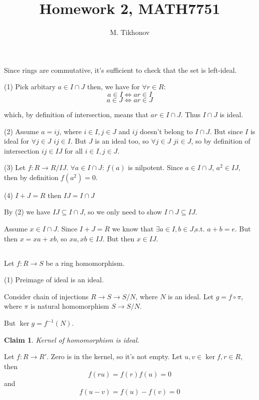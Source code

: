 \documentclass{amsart}
\author{M. Tikhonov}
\title{Homework 2, MATH7751}
\newtheorem*{claim}{Claim}
\begin{document}
\maketitle
\subsection{}

Since rings are commutative, it's sufficient to check that the set is left-ideal.

(1) Pick arbitary $a \in I \cap J$ then, we have for $\forall r \in R$:
$$a \in I \iff ar \in I$$
$$a \in J \iff ar \in J$$

which, by definition of intersection, means that $ar \in I \cap J$. Thus $I \cap J$ is ideal.

(2) Assume $a = ij$, where $i \in I, j \in J$ and $ij$ doesn't belong to $I\cap J$. But since $I$ is ideal for $\forall j \in J$ $ij \in I$. But $J$ is an ideal too, so $\forall j \in J$ $ji \in J$, so by definition of intersection $ij \in IJ$ for all $i \in I, j \in J$.

(3) Let $f: R \to R/ IJ$. $\forall a \in I \cap J$:  $f(a)$ is nilpotent.
Since $a \in I \cap J$, $a^2 \in IJ$, then by definition $f(a^2) = 0$.

(4) $I + J = R$ then $IJ = I \cap J$

By (2) we have $IJ \subseteq I \cap J$, so we only need to show $I \cap J \subseteq IJ$.

Assume $x \in I \cap J$. Since $I+J=R$ we know that $\exists a \in I, b \in J$,s.t. $a+b = e$. But then $x = xa + xb$, so $xa, xb \in IJ$. But then $x \in IJ$.

\subsection{}

Let $f: R \to S$ be a ring homomorphism.

(1) Preimage of ideal is an ideal. 

Consider chain of injections $R \to S \to S/N$, where $N$ is an ideal. Let $g = f \circ \pi$, where $\pi$ is natural homomorphism $S \to S/N$. 

But $\ker g = f^{-1} (N)$. 

\begin{claim} Kernel of homomorphism is ideal.
\end{claim}
    Let $f: R \to R'$. Zero is in the kernel, so it's not empty. Let $u,v \in \ker f, r\in R$, then
    $$ f(ru) = f(r) f(u) = 0$$
    and 
    $$ f(u - v) = f(u) - f(v) = 0$$
\end{document}
